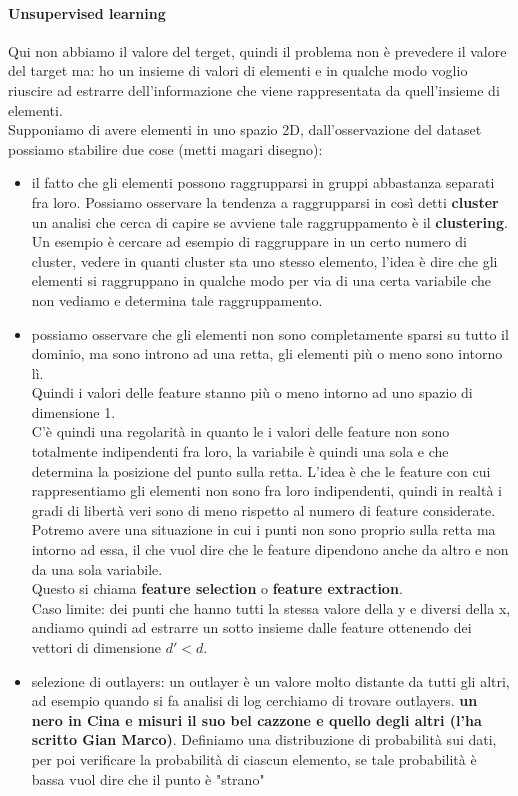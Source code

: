 \documentclass[12pt, oneside]{extbook}
\begin{document}
\paragraph{Unsupervised learning}
Qui non abbiamo il valore del terget, quindi il problema non è prevedere il valore del target ma: ho un insieme di valori di elementi e in qualche modo voglio riuscire ad estrarre dell'informazione che viene rappresentata da quell'insieme di elementi.\\Supponiamo di avere elementi in uno spazio 2D, dall'osservazione del dataset possiamo stabilire due cose (metti magari disegno):
\begin{itemize}
	\item il fatto che gli elementi possono raggrupparsi in gruppi abbastanza separati fra loro. Possiamo osservare la tendenza a raggrupparsi in così detti \textbf{cluster} un analisi che cerca di capire se avviene tale raggruppamento è il \textbf{clustering}.\\Un esempio è cercare ad esempio di raggruppare in un certo numero di cluster, vedere in quanti cluster sta uno stesso elemento, l'idea è dire che gli elementi si raggruppano in qualche modo per via di una certa variabile che non vediamo e determina tale raggruppamento.
	\item possiamo osservare che gli elementi non sono completamente sparsi su tutto il dominio, ma sono introno ad una retta, gli elementi più o meno sono intorno lì.\\Quindi i valori delle feature stanno più o meno intorno ad uno spazio di dimensione 1.\\C'è quindi una regolarità in quanto le i valori delle feature non sono totalmente indipendenti fra loro, la variabile è quindi una sola e che determina la posizione del punto sulla retta. L'idea è che le feature con cui rappresentiamo gli elementi non sono fra loro indipendenti, quindi in realtà i gradi di libertà veri sono di meno rispetto al numero di feature considerate.\\Potremo avere una situazione in cui i punti non sono proprio sulla retta ma intorno ad essa, il che vuol dire che le feature dipendono anche da altro e non da una sola variabile.\\Questo si chiama \textbf{feature selection} o \textbf{feature extraction}.\\Caso limite: dei punti che hanno tutti la stessa valore della y e diversi della x, andiamo quindi ad estrarre un sotto insieme dalle feature ottenendo dei vettori di dimensione $d'< d$.
	\item selezione di outlayers: un outlayer è un valore molto distante da tutti gli altri, ad esempio quando si fa analisi di log cerchiamo di trovare outlayers. \textsf{\textbf{un nero in Cina e misuri il suo bel cazzone e quello degli altri (l'ha scritto Gian Marco)}}. Definiamo una distribuzione di probabilità sui dati, per poi verificare la probabilità di ciascun elemento, se tale probabilità è bassa vuol dire che il punto è "strano" 
\end{itemize}
\end{document}
